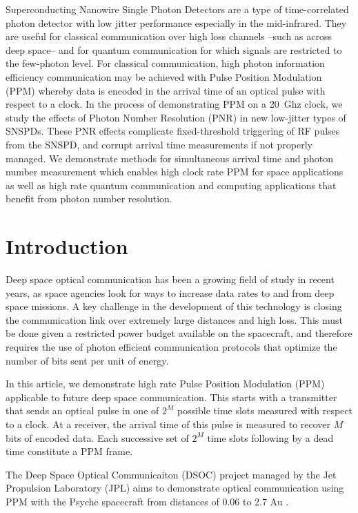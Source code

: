 \documentclass[11pt]{caltech_thesis} %
\begin{document}
Superconducting Nanowire Single Photon Detectors are a type of
time-correlated photon detector with low jitter performance especially
in the mid-infrared. They are useful for classical communication over
high loss channels --such as across deep space-- and for quantum
communication for which signals are restricted to the few-photon level.
For classical communication, high photon information efficiency
communication may be achieved with Pulse Position Modulation (PPM)
whereby data is encoded in the arrival time of an optical pulse with
respect to a clock. In the process of demonstrating PPM on a 20~Ghz
clock, we study the effects of Photon Number Resolution (PNR) in new
low-jitter types of SNSPDs. These PNR effects complicate fixed-threshold
triggering of RF pulses from the SNSPD, and corrupt arrival time
measurements if not properly managed. We demonstrate methods for
simultaneous arrival time and photon number measurement which enables
high clock rate PPM for space applications as well as high rate quantum
communication and computing applications that benefit from photon number
resolution.

\hypertarget{introduction-2}{%
\section{Introduction}\label{introduction-2}}

Deep space optical communication has been a growing field of study in
recent years, as space agencies look for ways to increase data rates to
and from deep space missions. A key challenge in the development of this
technology is closing the communication link over extremely large
distances and high loss. This must be done given a restricted power
budget available on the spacecraft, and therefore requires the use of
photon efficient communication protocols that optimize the number of
bits sent per unit of energy.

In this article, we demonstrate high rate Pulse Position Modulation
(PPM) applicable to future deep space communication. This starts with a
transmitter that sends an optical pulse in one of $2^M$ possible time
slots measured with respect to a clock. At a receiver, the arrival time
of this pulse is measured to recover $M$ bits of encoded data. Each
successive set of $2^M$ time slots following by a dead time constitute a
PPM frame.

The Deep Space Optical Communicaiton (DSOC) project managed by the Jet
Propulsion Laboratory (JPL) aims to demonstrate optical communication
using PPM with the Psyche spacecraft from distances of 0.06 to 2.7 Au
\autocite{Srinivasan2023GroundReceiver}.
\end{document}
